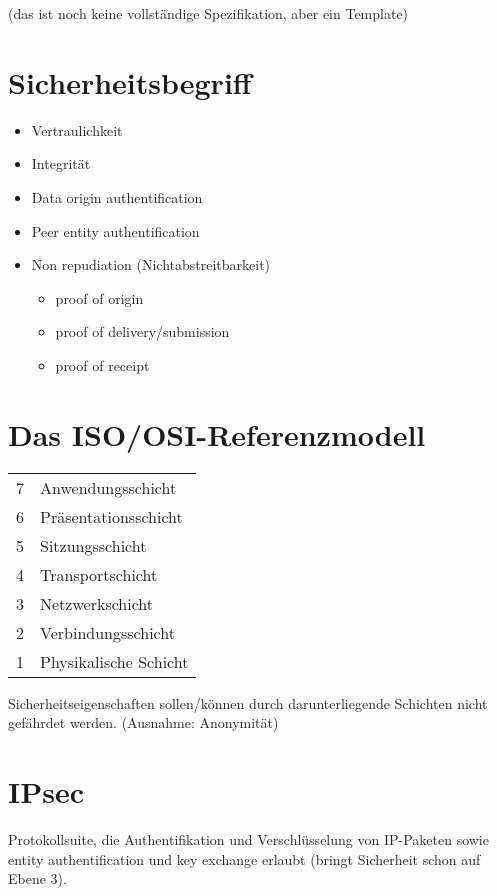 \documentclass[a4paper,twoside,DIV15,BCOR12mm]{scrbook}
\begin{document}
(das ist noch keine vollständige Spezifikation, aber ein \glqq Template\grqq)

\section{Sicherheitsbegriff}

\begin{itemize}
	\item Vertraulichkeit
	\item Integrität
	\item Data origin authentification
	\item Peer entity authentification
	\item Non repudiation (Nichtabstreitbarkeit)
		\begin{itemize}
			\item proof of origin
			\item proof of delivery/submission
			\item proof of receipt
		\end{itemize}
\end{itemize}

\section{Das ISO/OSI-Referenzmodell}

\begin{tabular}{ll}
7 & Anwendungsschicht\\
6 & Präsentationsschicht\\
5 & Sitzungsschicht\\
4 & Transportschicht\\
3 & Netzwerkschicht\\
2 & Verbindungsschicht\\
1 & Physikalische Schicht
\end{tabular}

Sicherheitseigenschaften sollen/können durch darunterliegende Schichten nicht gefährdet werden. (Ausnahme: Anonymität)

\section{IPsec}

Protokollsuite, die Authentifikation und Verschlüsselung von IP-Paketen sowie entity authentification und key exchange erlaubt (bringt Sicherheit schon auf Ebene 3).\\
\end{document}
